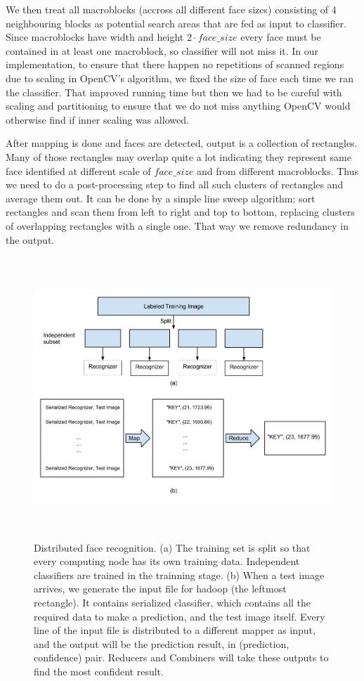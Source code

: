 \documentclass[11pt, draftclsnofoot, onecolumn]{IEEEtran}
\begin{document}
We then treat all macroblocks (accross all different face sizes) consisting of 4 neighbouring blocks as potential search areas that are fed as input to classifier. Since macroblocks have width and height $2 \cdot face\_size$ every face must be contained in at least one macroblock, so classifier will not miss it. In our implementation, to ensure that there happen no repetitions of scanned regions due to scaling in OpenCV's algorithm, we fixed the size of face each time we ran the classifier. That improved running time but then we had to be careful with scaling and partitioning to ensure that we do not miss anything OpenCV would otherwise find if inner scaling was allowed.

After mapping is done and faces are detected, output is a collection of rectangles. Many of those rectangles may overlap quite a lot indicating they represent same face identified at different scale of $face\_size$ and from different macroblocks. Thus we need to do a post-processing step to find all such clusters of rectangles and average them out. It can be done by a simple line sweep algorithm; sort rectangles and scan them from left to right and top to bottom, replacing clusters of overlapping rectangles with a single one. That way we remove redundancy in the output. 

\begin{figure}
\centering
\includegraphics[height=300pt]{recog_overview}
\caption{Distributed face recognition. (a) The training set is split so that every computing node has its own training data. Independent classifiers are trained in the trainning stage. (b) When a test image arrives, we generate the input file for hadoop (the leftmost rectangle). It contains serialized classifier, which contains all the required data to make a prediction, and the test image itself. Every line of the input file is distributed to a different mapper as input, and the output will be the prediction result, in (prediction, confidence) pair. Reducers and Combiners will take these outputs to find the most confident result.}
\label{fig:recog_overview}
\end{figure}
\end{document}
